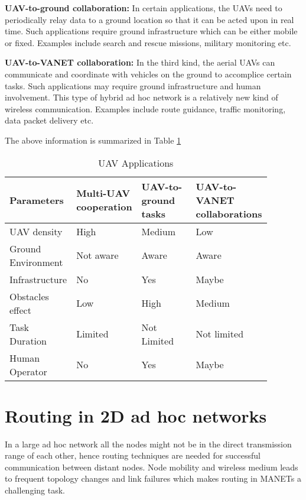 \textbf{UAV-to-ground collaboration:} In certain applications, the UAVs need to periodically relay data to a ground location so that it can be acted upon in real time. Such applications require ground infrastructure which can be either mobile or fixed. Examples include search and rescue missions, military monitoring etc.

\textbf{UAV-to-VANET collaboration:} In the third kind, the aerial UAVs can communicate and coordinate with vehicles on the ground to accomplice certain tasks. Such applications may require ground infrastructure and human involvement. This type of hybrid ad hoc network is a relatively new kind of wireless communication. Examples include route guidance, traffic monitoring, data packet delivery etc.

The above information is summarized in Table \ref{tab:uav_applications}

\begin{table}
\caption{UAV Applications}
\label{tab:uav_applications}
\begin{tabular}{|p{0.22\linewidth}|p{0.22\linewidth}|p{0.22\linewidth}|p{0.22\linewidth}|}
\toprule
Parameters & Multi-UAV cooperation & UAV-to-ground tasks & UAV-to-VANET collaborations\\
\midrule
UAV density & High & Medium & Low\\
\midrule
Ground Environment 	& Not aware &  Aware & Aware  \\
\midrule
Infrastructure & No & Yes &  Maybe \\
\midrule
Obstacles effect & Low & High & Medium \\
\midrule
Task Duration & Limited & Not Limited & Not limited \\
\midrule
Human Operator & No & Yes & Maybe \\
\bottomrule
\end{tabular}
\end{table}

\section{Routing in 2D ad hoc networks}

In a large ad hoc network all the nodes might not be in the direct transmission range of each other, hence routing techniques are needed for successful communication between distant nodes. Node mobility and wireless medium leads to frequent topology changes and link failures which makes routing in MANETs a challenging task.


